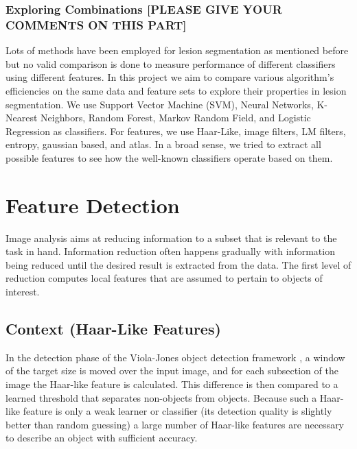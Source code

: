 \documentclass{article} %
\begin{document}
\subsubsection{ Exploring Combinations [PLEASE GIVE YOUR COMMENTS ON THIS PART] }
Lots of methods have been employed for lesion segmentation as mentioned before but no valid comparison is done to measure performance of different classifiers using different features. In this project we aim to compare various algorithm's efficiencies on the same data and feature sets to explore their properties in  lesion segmentation. We use Support Vector Machine (SVM), Neural Networks, K-Nearest Neighbors, Random Forest, Markov Random Field, and Logistic Regression as classifiers. For features, we use Haar-Like, image filters, LM filters, entropy, gaussian based, and atlas. In a broad sense, we tried to extract all possible features to see how the well-known classifiers operate based on them.

\section{Feature Detection}
Image analysis aims at reducing information to a subset that is relevant to the task in hand. Information reduction often happens gradually with information being reduced until the desired result is extracted from the data. \cite{toennies2012guide} The first level of reduction computes local features that
are assumed to pertain to objects of interest. 
\subsection{Context (Haar-Like Features)}
In the detection phase of the Viola-Jones object detection framework \cite{Viola-Jones}, a window of the target size is moved over the input image, and for each subsection of the image the Haar-like feature is calculated. This difference is then compared to a learned threshold that separates non-objects from objects. Because such a Haar-like feature is only a weak learner or classifier (its detection quality is slightly better than random guessing) a large number of Haar-like features are necessary to describe an object with sufficient accuracy. 
\end{document}
